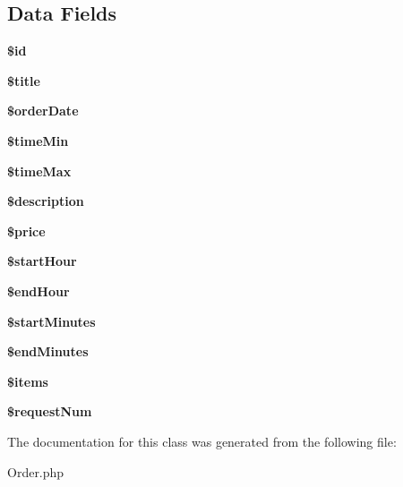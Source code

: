 \subsection*{Data Fields}
\begin{DoxyCompactItemize}
\item 
\hypertarget{classapp_1_1models_1_1_order_ae97941710d863131c700f069b109991e}{}\label{classapp_1_1models_1_1_order_ae97941710d863131c700f069b109991e} 
{\bfseries \$id}
\item 
\hypertarget{classapp_1_1models_1_1_order_ada57e7bb7c152edad18fe2f166188691}{}\label{classapp_1_1models_1_1_order_ada57e7bb7c152edad18fe2f166188691} 
{\bfseries \$title}
\item 
\hypertarget{classapp_1_1models_1_1_order_a51c1f7f25645a07747fa01f228379fec}{}\label{classapp_1_1models_1_1_order_a51c1f7f25645a07747fa01f228379fec} 
{\bfseries \$order\+Date}
\item 
\hypertarget{classapp_1_1models_1_1_order_a5333f745a6658b550580058a49045aa6}{}\label{classapp_1_1models_1_1_order_a5333f745a6658b550580058a49045aa6} 
{\bfseries \$time\+Min}
\item 
\hypertarget{classapp_1_1models_1_1_order_ab808cd870015a2884e59c4678f9a54c9}{}\label{classapp_1_1models_1_1_order_ab808cd870015a2884e59c4678f9a54c9} 
{\bfseries \$time\+Max}
\item 
\hypertarget{classapp_1_1models_1_1_order_a87b032cba06009e3467abf1c8018d960}{}\label{classapp_1_1models_1_1_order_a87b032cba06009e3467abf1c8018d960} 
{\bfseries \$description}
\item 
\hypertarget{classapp_1_1models_1_1_order_a264091074b1a8f4ed0abefd278831f6f}{}\label{classapp_1_1models_1_1_order_a264091074b1a8f4ed0abefd278831f6f} 
{\bfseries \$price}
\item 
\hypertarget{classapp_1_1models_1_1_order_ad9b483d997a82a0edafc4bde35623d1c}{}\label{classapp_1_1models_1_1_order_ad9b483d997a82a0edafc4bde35623d1c} 
{\bfseries \$start\+Hour}
\item 
\hypertarget{classapp_1_1models_1_1_order_af2e188a163893425afeca92f9e13b8f2}{}\label{classapp_1_1models_1_1_order_af2e188a163893425afeca92f9e13b8f2} 
{\bfseries \$end\+Hour}
\item 
\hypertarget{classapp_1_1models_1_1_order_a56867ee79b138bae27ff55326b67d014}{}\label{classapp_1_1models_1_1_order_a56867ee79b138bae27ff55326b67d014} 
{\bfseries \$start\+Minutes}
\item 
\hypertarget{classapp_1_1models_1_1_order_a0f7c9896d989d4c8261db201fadfe194}{}\label{classapp_1_1models_1_1_order_a0f7c9896d989d4c8261db201fadfe194} 
{\bfseries \$end\+Minutes}
\item 
\hypertarget{classapp_1_1models_1_1_order_a737abdef83dabb219182c1e88887c6c3}{}\label{classapp_1_1models_1_1_order_a737abdef83dabb219182c1e88887c6c3} 
{\bfseries \$items}
\item 
\hypertarget{classapp_1_1models_1_1_order_abd9e73ab30c6a3dec0abe89bd2b55240}{}\label{classapp_1_1models_1_1_order_abd9e73ab30c6a3dec0abe89bd2b55240} 
{\bfseries \$request\+Num}
\end{DoxyCompactItemize}


The documentation for this class was generated from the following file\+:\begin{DoxyCompactItemize}
\item 
Order.\+php\end{DoxyCompactItemize}
